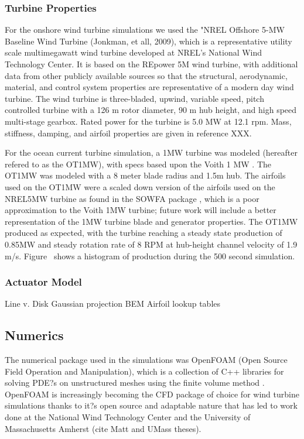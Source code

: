 \subsubsection{Turbine Properties}
For the onshore wind turbine simulations we used the "NREL Offshore 5-MW Baseline Wind Turbine (Jonkman, et all, 2009), which is a representative utility scale multimegawatt wind turbine developed at NREL's National Wind Technology Center.  It is based on the REpower 5M wind turbine, with additional data from other publicly available sources so that the structural, aerodynamic, material, and control system properties are representative of a modern day wind turbine.  The wind turbine is three-bladed, upwind, variable speed, pitch controlled turbine with a 126 m rotor diameter, 90 m hub height, and high speed multi-stage gearbox.  Rated power for the turbine is 5.0 MW at 12.1 rpm.  Mass, stiffness, damping, and airfoil properties are given in reference XXX.

For the ocean current turbine simulation, a 1MW turbine was modeled (hereafter refered to as the OT1MW), with specs based upon the Voith 1 MW \cite{Voith}. The OT1MW was modeled with a 8 meter blade radius and 1.5m hub. The airfoils used on the OT1MW were a scaled down version of the airfoils used on the NREL5MW turbine as found in the SOWFA package \cite{SOWFA}, which is a poor approximation to the Voith 1MW turbine; future work will include a better representation of the 1MW turbine blade and generator properties. The OT1MW produced as expected, with the turbine reaching a steady state production of 0.85MW and steady rotation rate of 8 RPM at hub-height channel velocity of 1.9 m/s. Figure~ shows a histogram of production during the 500 second simulation.


\subsubsection{Actuator Model}

Line v. Disk
Gaussian projection
BEM
Airfoil lookup tables


\subsection{Numerics}


The numerical package used in the simulations was OpenFOAM (Open Source Field Operation and Manipulation), which is a collection of C++ libraries for solving PDE?s on unstructured meshes using the finite volume method \cite{OpenFoam}. OpenFOAM is increasingly becoming the CFD package of choice for wind turbine simulations thanks to it?s open source and adaptable nature that has led to work done at the National Wind Technology Center and the University of Massachusetts Amherst (cite Matt and UMass theses).  

